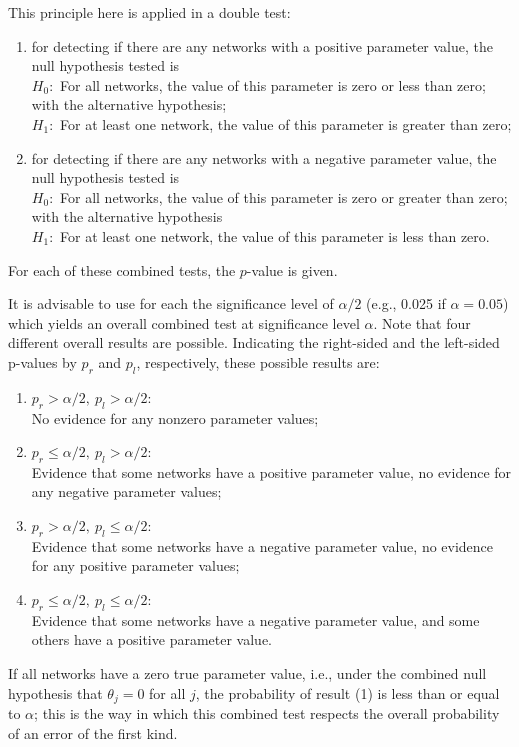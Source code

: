 \documentclass[a4paper,fleqn,11pt]{article}
\newcommand{\+}{\, + \,}
\begin{document}
This principle here is applied in a double test:
\begin{enumerate}
\item for detecting if there are any networks with a positive parameter value,
         the null hypothesis tested is\\
       $H_0 :$   For all networks, the value of this parameter
            is zero or less than zero;\\
            with the alternative hypothesis;\\
        $H_1 :$
             For at least one network, the value of this parameter
             is greater than zero;
\item for detecting if there are any networks with a negative parameter value,
         the null hypothesis tested is\\
            $H_0 :$ For all networks, the value of this parameter
                  is zero or greater than zero;\\
            with the alternative hypothesis\\
            $H_1 :$ For at least one network, the value of this parameter
                   is less than zero.
\end{enumerate}
      For each of these combined tests, the $p$-value is given.

      It is advisable to use for each the significance level of $\alpha/2$
      (e.g., 0.025 if $\alpha = 0.05$) which yields an overall combined test
      at significance level $\alpha$.
      Note that four different overall results are possible.
      Indicating the right-sided and the left-sided p-values
      by $p_r$ and $p_l$,
      respectively, these possible results are:
      \begin{enumerate}
         \item $p_r >   \alpha/2, \  p_l >   \alpha/2$:\\
         No evidence for any nonzero parameter values;
         \item $p_r \leq \alpha/2, \ p_l >   \alpha/2$:\\
         Evidence that some networks have a positive parameter value,
         no evidence for any negative parameter values;
         \item $p_r >   \alpha/2, \ p_l \leq \alpha/2$:\\
         Evidence that some networks have a negative parameter value,
         no evidence for any positive parameter values;
         \item $p_r \leq \alpha/2, \ p_l \leq \alpha/2$:\\
         Evidence that some networks have a negative parameter value,
         and some others have a positive parameter value.
\end{enumerate}
      If all networks have a zero true parameter value,
      i.e., under the combined null hypothesis that
      $\theta_j = 0$  for all $j$,
      the probability of result (1) is less than or equal to $\alpha$;
      this is the way in which this combined test respects the
      overall probability of an error of the first kind.
\end{document}
